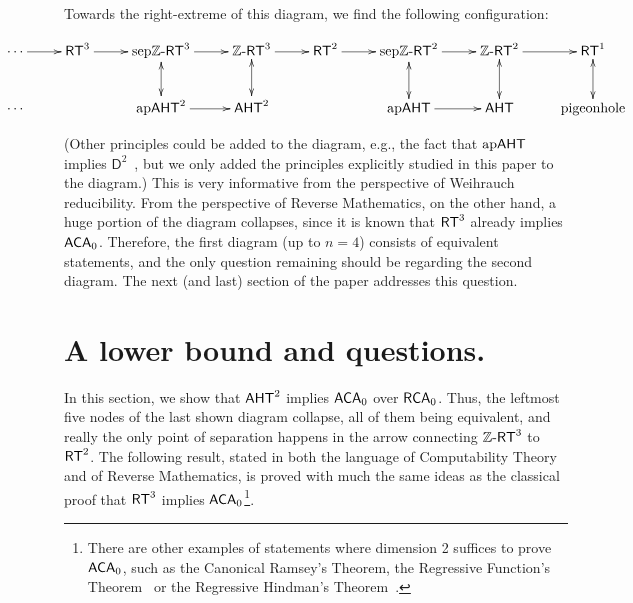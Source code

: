 \documentclass[11pt]{amsart}
\newcommand{\rt}{\mathnormal{\mathsf{RT}}}
\newcommand{\zrt}{\mathnormal{\mathbb Z\text{-}\mathsf{RT}}}
\newcommand{\aht}{\mathnormal{\mathsf{AHT}}}
\newcommand{\apaht}{\mathnormal{\mathrm{ap}\mathsf{AHT}}}
\newcommand{\sepzrt}{\mathnormal{\mathrm{sep}\mathbb Z\text{-}\mathsf{RT}}}
\newcommand{\rca}{\mathnormal{\mathsf{RCA}}_0}
\newcommand{\aca}{\mathnormal{\mathsf{ACA}}_0}
\theoremstyle{definition}
\begin{document}
Towards the right-extreme of this diagram, we find the following configuration:

\begin{equation*}
\centerline{\xymatrix{
\cdots \ar@{->}[r] & \rt^3 \ar@{->}[r] & \sepzrt^3 \ar@{->}[r] \ar@{<->}[d] & \zrt^3 \ar@{->}[r] \ar@{<->}[d] & \rt^2 \ar@{->}[r] & \sepzrt^2 \ar@{->}[r] \ar@{<->}[d] & \zrt^2 \ar@{->}[r] \ar@{<->}[d] & \rt^1\ar@{<->}[d] \\
\cdots &  & \apaht^2 \ar@{->}[r] & \aht^2 &  & \apaht \ar@{->}[r]  & \aht  & \text{pigeonhole} \\
}}
\end{equation*}

(Other principles could be added to the diagram, e.g., the fact that $\apaht$ implies $\mathsf{D}^2$~\cite{carlucci-adjacent}, but we only added the principles explicitly studied in this paper to the diagram.) This is very informative from the perspective of Weihrauch reducibility. From the perspective of Reverse Mathematics, on the other hand, a huge portion of the diagram collapses, since it is known that $\rt^3$ already implies $\aca$. Therefore, the first diagram (up to $n=4$) consists of equivalent statements, and the only question remaining should be regarding the second diagram. The next (and last) section of the paper addresses this question.

\section{A lower bound and questions.}

In this section, we show that $\aht^2$ implies $\aca$ over $\rca$. Thus, the leftmost five nodes of the last shown diagram collapse, all of them being equivalent, and really the only point of separation happens in the arrow connecting $\zrt^3$ to $\rt^2$. The following result, stated in both the language of Computability Theory and of Reverse Mathematics, is proved with much the same ideas as the classical proof that $\rt^3$ implies $\aca$\footnote{There are other examples of statements where dimension 2 suffices to prove $\aca$, such as the Canonical Ramsey's Theorem, the Regressive Function's Theorem~\cite{mileti} or the Regressive Hindman's Theorem~\cite{carlucci-mainardi}.}.
\end{document}
